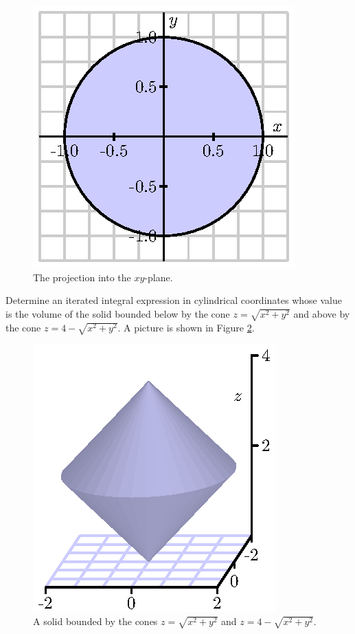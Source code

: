 \begin{activity}
\begin{figure}[ht]
\begin{center}
\begin{minipage}{2.5in}
\begin{center}
  \includegraphics{figures/fig_11_8_cone_project.eps}
\end{center}
\caption{The projection into the $xy$-plane.}
\label{F:11.8.Cylindrical_proj}
\end{minipage}
\end{center}
\end{figure}

	\item Determine an iterated integral expression in cylindrical coordinates whose value is the volume of the solid bounded below by the cone $z = \sqrt{x^2+y^2}$ and above by the cone $z = 4 - \sqrt{x^2+y^2}$. A picture is shown in Figure \ref{F:11.8.Cylindrical_ex2}.
\begin{figure}[ht]
\begin{center}
  \includegraphics{figures/fig_11_8_two_cones.eps}
\end{center}
\caption{A solid bounded by the cones $z = \sqrt{x^2+y^2}$  and $z = 4 - \sqrt{x^2+y^2}$.}
\label{F:11.8.Cylindrical_ex2}
\end{figure}

\ea

\end{activity}
